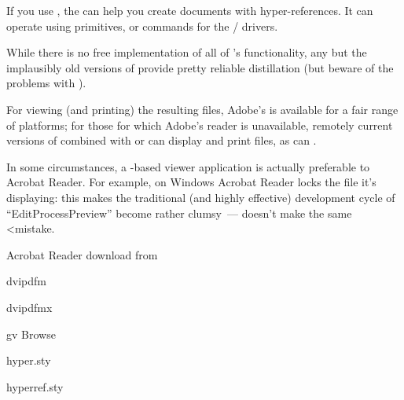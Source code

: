 If you use \plaintex{}, the  can
help you create  documents with hyper-references.
It can operate using \PDFTeX{} primitives, or  commands
for the /  drivers.

While there is no free implementation of all of 
's
functionality, any but the implausibly old versions of
\href{http://www.ghostscript.com/}{}
provide pretty reliable distillation (but beware of the problems with
).

For viewing (and printing) the resulting files, Adobe's
  is available for a fair range of
platforms; for those for which Adobe's reader is unavailable, remotely
current versions of \href{http://www.ghostscript.com/}{}
combined with  or
\href{http://www.ghostgum.com.au/}{} can display and
print  files, as can .

In some circumstances, a
\href{http://www.ghostscript.com/}{}-based viewer
application is actually preferable to Acrobat Reader.  For example, on
Windows Acrobat Reader locks the  file it's displaying: this
makes the traditional (and highly effective) \AllTeX{} development
cycle of ``Edit\arrowhyph{}Process\arrowhyph{}Preview'' become
rather clumsy~--- \href{http://www.ghostgum.com.au/}{}
doesn't make the same <mistake.
\begin{ctanrefs}
\item[\nothtml{\rmfamily}Acrobat Reader]download from 
\item[dvipdfm]
\item[dvipdfmx]
\item[gv]Browse 
\item[hyper.sty]
\item[hyperref.sty]
\end{ctanrefs}


